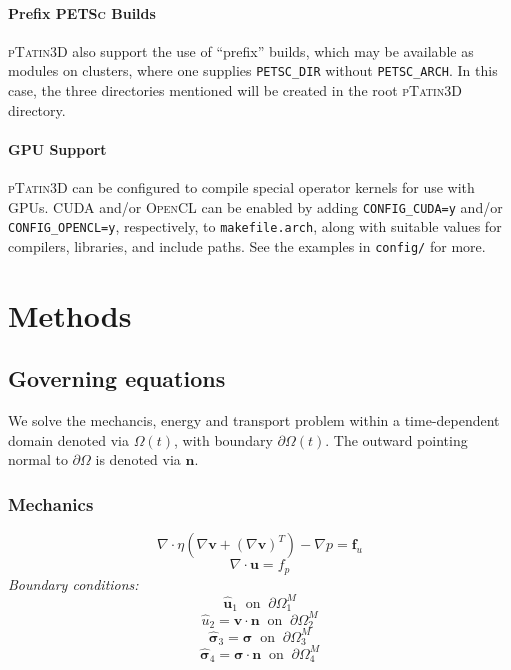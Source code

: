 \documentclass[paper=a4, fontsize=10pt,twoside]{scrartcl}
\newcommand{\ptat}{{{\textsc{pTatin3D}}}}
\newcommand{\PETSc}{{{\textsc{PETSc}}}}
\newcommand{\CUDA}{{{\textsc{CUDA}}}}
\newcommand{\OpenCL}{{{\textsc{OpenCL}}}}
\newcommand{\unix}[1]{\texttt{\footnotesize #1}}
\begin{document}
\paragraph{Prefix \PETSc{} Builds}
\ptat{} also support the use of ``prefix'' builds, which may be available as modules on clusters, where one supplies \unix{PETSC\_DIR} without \unix{PETSC\_ARCH}. In this case, the three directories mentioned will be created in the root \ptat{} directory.

\paragraph{GPU Support}
\ptat{} can be configured to compile special operator kernels for use with GPUs. \CUDA{} and/or \OpenCL{} can be enabled by adding \lstinline{CONFIG_CUDA=y} and/or \lstinline{CONFIG_OPENCL=y}, respectively, to \texttt{makefile.arch}, along with suitable values for compilers, libraries, and include paths.
See the examples in \texttt{config/} for more.

\section{Methods}

\subsection{Governing equations}

We solve the mechancis, energy and transport problem within a time-dependent domain 
denoted via $\Omega(t)$, with boundary $\partial \Omega(t)$. 
The outward pointing normal to $\partial \Omega$ is denoted via $\boldsymbol n$.

\subsubsection*{Mechanics}
$$
	\nabla \cdot \eta \left( \nabla \boldsymbol v + (\nabla \boldsymbol v)^T \right) - \nabla p = \boldsymbol f_u
$$
$$
	\nabla \cdot \boldsymbol u = f_p
$$
\textit{Boundary conditions:}
$$
	\hat{\boldsymbol u}_1 \medspace \text{ on } \medspace \partial \Omega^M_1
$$
$$
	\hat{u}_2 = \boldsymbol v \cdot \boldsymbol n \medspace \text{ on } \medspace \partial \Omega^M_2
$$
$$
	\hat{\boldsymbol \sigma}_3 = \boldsymbol \sigma \medspace \text{ on } \medspace \partial \Omega^M_3
$$
$$
	\hat{\boldsymbol \sigma}_4 = \boldsymbol \sigma \cdot \boldsymbol n \medspace \text{ on } \medspace \partial \Omega^M_4
$$
\end{document}
